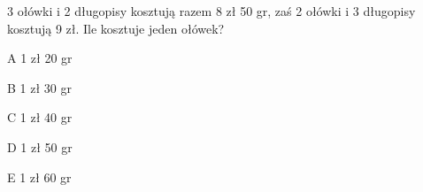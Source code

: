 \begin{tresc}
3 ołówki i 2 długopisy kosztują razem 8 zł 50 gr, zaś 2 ołówki i 3 długopisy kosztują 9 zł. Ile kosztuje jeden ołówek?
\end{tresc}
\begin{wariant}{A} 1 zł 20 gr \end{wariant}
\begin{wariant}{B} 1 zł 30 gr \end{wariant}
\begin{wariant}{C} 1 zł 40 gr \end{wariant}
\begin{wariant}{D} 1 zł 50 gr \end{wariant}
\begin{wariant}{E} 1 zł 60 gr \end{wariant}

